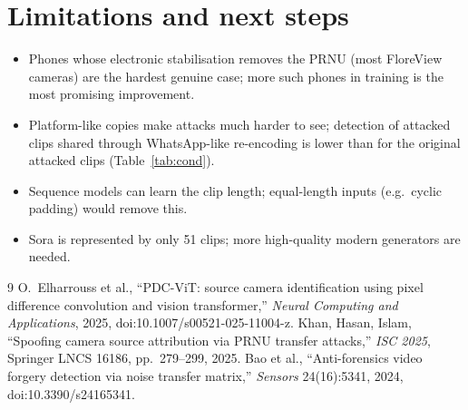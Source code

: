 \documentclass[11pt,a4paper]{article}
\begin{document}
\section{Limitations and next steps}\begin{itemize}
\item Phones whose electronic stabilisation removes the PRNU (most FloreView cameras) are the hardest genuine case;
      more such phones in training is the most promising improvement.
\item Platform-like copies make attacks much harder to see; detection of attacked clips shared through WhatsApp-like
      re-encoding is lower than for the original attacked clips (Table~\ref{tab:cond}).
\item Sequence models can learn the clip length; equal-length inputs (e.g.\ cyclic padding) would remove this.
\item Sora is represented by only 51 clips; more high-quality modern generators are needed.
\end{itemize}
\begin{thebibliography}{9}
 O.~Elharrouss et al., ``PDC-ViT: source camera identification using pixel difference convolution and
  vision transformer,'' \emph{Neural Computing and Applications}, 2025, doi:10.1007/s00521-025-11004-z.
 Khan, Hasan, Islam, ``Spoofing camera source attribution via PRNU transfer attacks,''
  \emph{ISC 2025}, Springer LNCS 16186, pp.~279--299, 2025.
 Bao et al., ``Anti-forensics video forgery detection via noise transfer matrix,''
  \emph{Sensors} 24(16):5341, 2024, doi:10.3390/s24165341.
\end{thebibliography}
\end{document}
